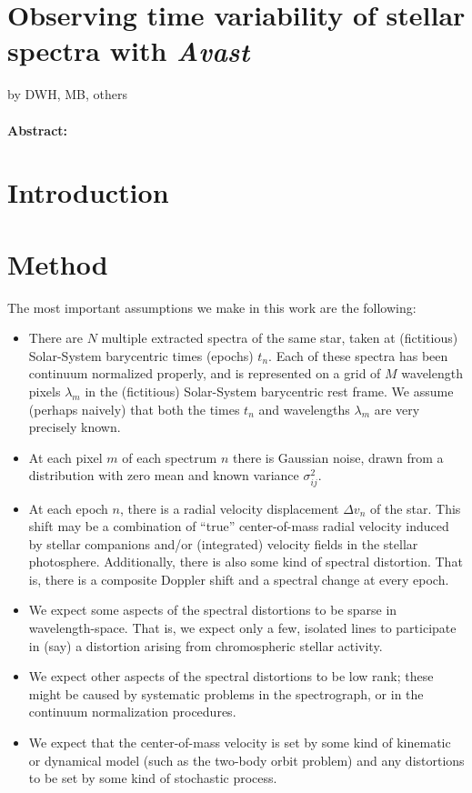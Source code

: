 \documentclass[12pt, letterpaper]{article}
\newcommand{\project}[1]{\textsl{#1}}
\newcommand{\Avast}{\project{A$\!$vast}}
\begin{document}
\section*{Observing time variability of stellar spectra with \Avast}

\noindent
by DWH, MB, others

\paragraph{Abstract:}


\section{Introduction}


\section{Method}

The most important assumptions we make in this work are the following:
\begin{itemize}\itemsep=0ex
\item There are $N$ multiple extracted spectra of the same star, taken
  at (fictitious) Solar-System barycentric times (epochs) $t_n$. Each
  of these spectra has been continuum normalized properly, and is
  represented on a grid of $M$ wavelength pixels $\lambda_m$ in the
  (fictitious) Solar-System barycentric rest frame. We assume (perhaps
  naively) that both the times $t_n$ and wavelengths $\lambda_m$ are
  very precisely known.
\item At each pixel $m$ of each spectrum $n$ there is Gaussian noise,
  drawn from a distribution with zero mean and known variance
  $\sigma^2_{ij}$.
\item At each epoch $n$, there is a radial velocity displacement
  $\Delta v_{n}$ of the star. This shift may be a combination
  of ``true'' center-of-mass radial velocity induced by stellar companions
  and/or (integrated) velocity fields in the stellar photosphere. Additionally,
  there is also some kind of spectral distortion.  That is, there is a
  composite Doppler shift and a spectral change at every epoch.
\item We expect some aspects of the spectral distortions to be sparse
  in wavelength-space.  That is, we expect only a few, isolated lines
  to participate in (say) a distortion arising from chromospheric stellar activity.
\item We expect other aspects of the spectral distortions to be low
  rank; these might be caused by systematic problems in the
  spectrograph, or in the continuum normalization procedures.
\item We expect that the center-of-mass velocity is set by some kind
  of kinematic or dynamical model (such as the two-body orbit problem)
  and any distortions to be set by some kind of stochastic process.
\end{itemize}
\end{document}
